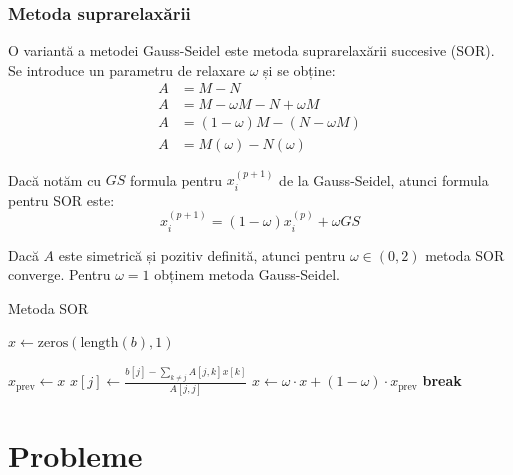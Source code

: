 \documentclass{exam}
\begin{document}
\subsubsection{Metoda suprarelaxării}

O variantă a metodei Gauss-Seidel este metoda suprarelaxării succesive (SOR).
Se introduce un parametru de relaxare $\omega$ și se obține:
\begin{align*}
	A & = M - N                           \\
	A & = M - \omega M - N + \omega M     \\
	A & = (1 - \omega) M - (N - \omega M) \\
	A & = M(\omega) - N(\omega)
\end{align*}

Dacă notăm cu $GS$ formula pentru $x_i^{(p+1)}$ de la Gauss-Seidel, atunci
formula pentru SOR este:
\begin{equation*}
	x_i^{(p+1)} = (1 - \omega) x_i^{(p)} + \omega GS
\end{equation*}

Dacă $A$ este simetrică și pozitiv definită, atunci pentru $\omega \in (0, 2)$
metoda SOR converge. Pentru $\omega = 1$ obținem metoda Gauss-Seidel.

\newpage
\begin{algorithm}
	\caption{Metoda SOR}
	\begin{algorithmic}[1]
		\State \( x \gets \text{zeros}(\text{length}(b),1) \) 

		\State \( x_{\text{prev}} \gets x \)
		\State \( x[j] \gets \frac{b[j] - \sum_{k \neq j}^{} A[j,k] x[k]}{A[j,j]} \)
		\EndFor
		\State \( x \gets \omega \cdot x + (1 - \omega) \cdot x_{\text{prev}} \) 
		\State \textbf{break}
		\EndIf
		\EndFor
	\end{algorithmic}
\end{algorithm}

\section{Probleme}
\end{document}
